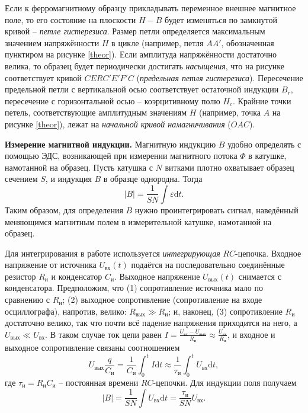 \documentclass[a4paper, 12pt]{article}
\begin{document}
        Если к ферромагнитному образцу прикладывать переменное внешнее магнитное поле, то его состояние на плоскости $H-B$ будет изменяться по замкнутой кривой -- \textit{петле гистерезиса}. Размер петли определяется максимальным значением напряжённости $H$ в цикле (например, петля $AA'$, обозначенная пунктиром на рисунке \ref{theor}). Если амплитуда напряжённости достаточно велика, то образец будет периодически достигать \textit{насыщения}, что на рисунке соответствует кривой $CERC'E'F'C$ (\textit{предельная петля гистерезиса}). Пересечение предельной петли с вертикальной осью соответствует остаточной индукции $B_r$, пересечение с горизонтальной осью -- коэрцитивному полю $H_c$. Крайние точки петель, соответствующие амплитудным значениям $H$ (например, точка $A$ на рисунке \ref{theor}), лежат на \textit{начальной кривой намагничивания} ($OAC$).

        \textbf{Измерение магнитной индукции.} Магнитную индукцию $B$ удобно определять с помощью ЭДС, возникающей при измерении магнитного потока $\Phi$ в катушке, намотанной на образец. Пусть катушка с $N$ витками плотно охватывает образец сечением $S$, и индукция $B$ в образце однородна. Тогда\[\left|B\right|=\frac{1}{SN}\int\varepsilon\text{d}t.\]Таким образом, для определения $B$ нужно проинтегрировать сигнал, наведённый меняющимся магнитным полем в измерительной катушке, намотанной на образец.

        Для интегрирования в работе используется \textit{интегрирующая} $RC$-цепочка. Входное напряжение от источника $U_{\text{вх}}(t)$ подаётся на последовательно соединённые резистор $R_{\text{и}}$ и конденсатор $C_{\text{и}}$. Выходное напряжение $U_{\text{вых}}(t)$ снимается с конденсатора. Предположим, что (1) сопротивление источника мало по сравнению с $R_{\text{и}}$; (2) выходное сопротивление (сопротивление на входе осциллографа), напротив, велико: $R_{\text{вых}}\gg R_{\text{и}}$; и, наконец, (3) сопротивление $R_{\text{и}}$ достаточно велико, так что почти всё падение напряжения приходится на него, а $U_{\text{вых}}\ll U_{\text{вх}}$. В таком случае ток цепи равен $I=\frac{U_{\text{вх}}-U_{\text{вых}}}{R_{\text{и}}}\approx\frac{U_{\text{вх}}}{R_{\text{и}}}$, и входное и выходное сопротивление связаны соотношением\[U_{\text{вых}}\frac{q}{C_{\text{и}}}=\frac{1}{C_{\text{и}}}\int_0^tI\text{d}t\approx\frac{1}{\tau_{\text{и}}}\int_0^tU_{\text{вх}}\text{d}t,\]где $\tau_{\text{и}}=R_{\text{и}}C_{\text{и}}$ -- постоянная времени $RC$-цепочки. Для индукции поля получаем\[\left|B\right|=\frac{1}{SN}\int U_{\text{вх}}\text{d}t=\frac{\tau_{\text{и}}}{SN}U_{\text{вх}}.\]
\end{document}
